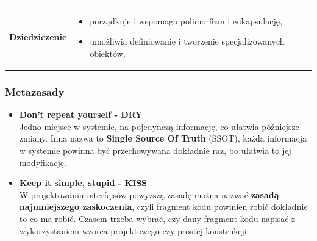 \documentclass[a4paper]{article}
\begin{document}
\begin{table}[H]
\begin{center}
\begin{tabular}{  p{3cm} p{12cm}  }
                \textbf{Dziedziczenie}
                &
                \begin{itemize}
                    \item porządkuje i wspomaga polimorfizm i enkapsulację,
                    \item umożliwia definiowanie i tworzenie specjalizowanych obiektów,
                \end{itemize}
            \end{tabular}
        \end{center}
    \end{table}

    \subsubsection{Metazasady}
    \begin{itemize}
        \item \textbf{Don't repeat yourself - DRY}\\
        Jedno miejsce w systemie, na pojedynczą informację, co ułatwia późniejsze zmiany.
        Inna nazwa to \textbf{Single Source Of Truth} (SSOT), każda informacja w systemie powinna być przechowywana
        dokładnie raz, bo ułatwia to jej modyfikację.
        \item \textbf{Keep it simple, stupid - KISS}\\
        W projektowaniu interfejsów powyższą zasadę można nazwać \textbf{zasadą najmniejszego zaskoczenia}, czyli
        fragment kodu powinien robić dokładnie to co ma robić. Czasem trzeba wybrać, czy dany fragment kodu
        napisać z wykorzystaniem wzorca projektowego czy prostej konstrukcji.
    \end{itemize}
\end{document}
